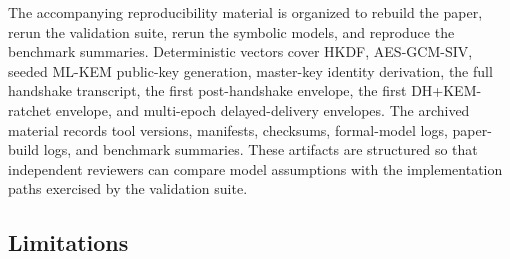 \documentclass[preprint,12pt]{elsarticle}
\theoremstyle{definition}
\begin{document}
The accompanying reproducibility material is organized to rebuild the paper,
rerun the validation suite, rerun the symbolic models, and reproduce the
benchmark summaries. Deterministic vectors cover HKDF, AES-GCM-SIV, seeded
ML-KEM public-key generation, master-key identity derivation, the full
handshake transcript, the first post-handshake envelope, the first
DH+KEM-ratchet envelope, and multi-epoch delayed-delivery envelopes. The
archived material records tool versions, manifests, checksums, formal-model
logs, paper-build logs, and benchmark summaries. These artifacts are structured
so that independent reviewers can compare model assumptions with the
implementation paths exercised by the validation suite.

\subsection{Limitations}
\end{document}

